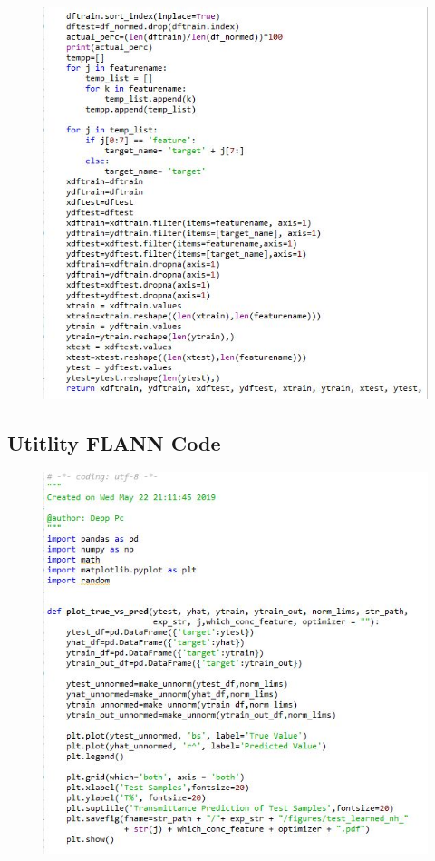 \documentclass[]{article}
\begin{document}
\begin{figure}
\centering
\includegraphics[width=1\textwidth,height=\textheight]{images/utility4.jpg}
\end{figure}


\hypertarget{utitlity-flann}{%
\subsection{Utitlity FLANN Code}\label{utitlity-flann}}


\begin{figure}
\centering
\includegraphics[width=1\textwidth,height=\textheight]{images/utilityflann1.jpg}
\end{figure}
\end{document}
